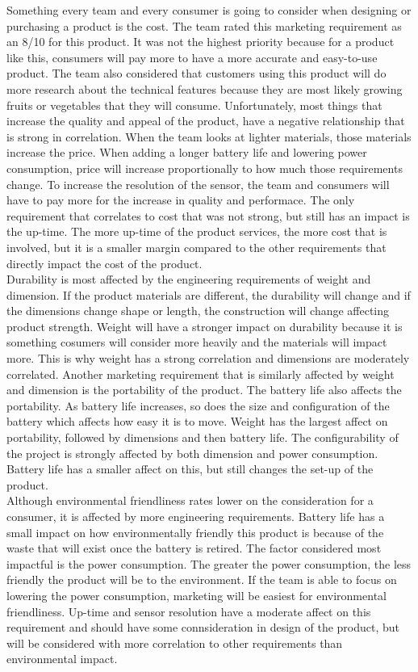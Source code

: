 Something every team and every consumer is going to consider when designing or purchasing a product is the cost. The team rated this marketing requirement as an 8/10 for this product. It was not the highest priority because for a product like this, consumers will pay more to have a more accurate and easy-to-use product. The team also considered that customers using this product will do more research about the technical features because they are most likely growing fruits or vegetables that they will consume. Unfortunately, most things that increase the quality and appeal of the product, have a negative relationship that is strong in correlation. When the team looks at lighter materials, those materials increase the price. When adding a longer battery life and lowering power consumption, price will increase proportionally to how much those requirements change. To increase the resolution of the sensor, the team and consumers will have to pay more for the increase in quality and performace. The only requirement that  correlates to cost that was not strong, but still has an impact is the up-time. The more up-time of the product services, the more cost that is involved, but it is a smaller margin compared to the other requirements that directly impact the cost of the product. \\

Durability is most affected by the engineering requirements of weight and dimension. If the product materials are different, the durability will change and if the dimensions change shape or length, the construction will change affecting product strength. Weight will have a stronger impact on durability because it is something cosumers will consider more heavily and the materials will impact more. This is why weight has a strong correlation and dimensions are moderately correlated. Another marketing requirement that is similarly affected by weight and dimension is the portability of the product. The battery life also affects the portability. As battery life increases, so does the size and configuration of the battery which affects how easy it is to move. Weight has the largest affect on portability, followed by dimensions and then battery life. The configurability of the project is strongly affected by both dimension and power consumption. Battery life has a smaller affect on this, but still changes the set-up of the product. \\

Although environmental friendliness rates lower on the consideration for a consumer, it is affected by more engineering requirements. Battery life has a small impact on how environmentally friendly this product is because of the waste that will exist once the battery is retired. The factor considered most impactful is the power consumption. The greater the power consumption, the less friendly the product will be to the environment. If the team is able to focus on lowering the power consumption, marketing will be easiest for environmental friendliness. Up-time and sensor resolution have a moderate affect on this requirement and should have some connsideration in design of the product, but will be considered with more correlation to other requirements than environmental impact. \\

